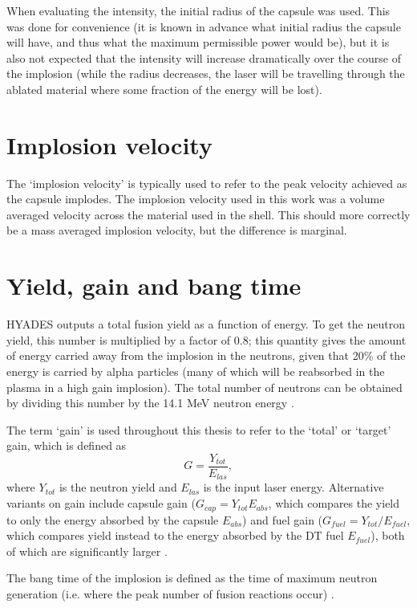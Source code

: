 When evaluating the intensity, the initial radius of the capsule was used. This was done for convenience (it is known in advance what initial radius the capsule will have, and thus what the maximum permissible power would be), but it is also not expected that the intensity will increase dramatically over the course of the implosion (while the radius decreases, the laser will be travelling through the ablated material where some fraction of the energy will be lost).

\section{Implosion velocity}

The `implosion velocity' is typically used to refer to the peak velocity achieved as the capsule implodes. The implosion velocity used in this work was a volume averaged velocity across the material used in the shell. This should more correctly be a mass averaged implosion velocity, but the difference is marginal. 

\section{Yield, gain and bang time}

HYADES outputs a total fusion yield as a function of energy. To get the neutron yield, this number is multiplied by a factor of 0.8; this quantity gives the amount of energy carried away from the implosion in the neutrons, given that 20\% of the energy is carried by alpha particles (many of which will be reabsorbed in the plasma in a high gain implosion). The total number of neutrons can be obtained by dividing this number by the 14.1 MeV neutron energy \cite{Atzeni2008}.

The term `gain' is used throughout this thesis to refer to the `total' or `target' gain, which is defined as \begin{equation} G = \frac{Y_{tot}}{E_{las}}, \end{equation} where $Y_{tot}$ is the neutron yield and $E_{las}$ is the input laser energy. Alternative variants on gain include capsule gain ($G_{cap} = Y_{tot}E_{abs}$, which compares the yield to only the energy absorbed by the capsule $E_{abs}$) and fuel gain ($G_{fuel} = Y_{tot} / E_{fuel}$, which compares yield instead to the energy absorbed by the DT fuel $E_{fuel}$), both of which are significantly larger \cite{Atzeni2008, Abu-Shawareb2022}.

The bang time of the implosion is defined as the time of maximum neutron generation (i.e. where the peak number of fusion reactions occur) \cite{Craxton2015}.

